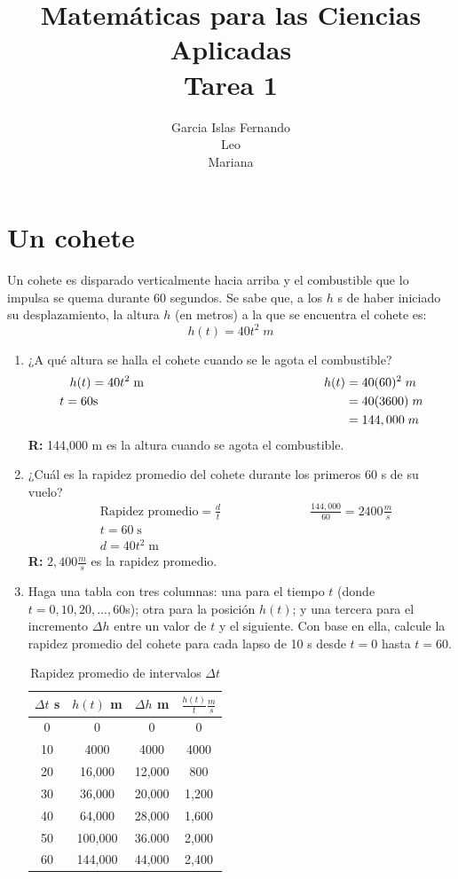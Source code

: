\documentclass[12pt]{article}
\title{Matemáticas para las Ciencias Aplicadas \\ Tarea 1}
\date{}
\author{Garcia Islas Fernando \\ Leo\\Mariana}
\begin{document}
\maketitle
\section{\large Un cohete}
Un cohete es disparado verticalmente hacia arriba y el combustible que lo impulsa se quema durante 60 segundos. Se sabe que, a los $h$ s de haber iniciado su desplazamiento, la altura $h$ (en metros) a la que se encuentra el cohete es: \[h(t) = 40 t^2 \; m\]
\begin{enumerate}
\item ¿A qué altura se halla el cohete cuando se le agota el combustible?
  \begin{align*}
    h(t)= 40t^2 \; \text{m} \hspace{5.1cm}    h(t)&=40(60)^2 \; m\\
t=60\text{s} \hspace{7cm}    &=40(3600) \; m\\
    &=144,000 \; m\\
  \end{align*}
  {\bf R:} 144,000 m es la altura cuando se agota el combustible.
\item ¿Cuál es la rapidez promedio del cohete durante los primeros 60 s de su vuelo?
  \begin{align*}
    &\text{Rapidez promedio}=\frac{d}{t} \hspace{3cm}\frac{144,000}{60}= 2400 \frac{m}{s}\\
    &t = 60\; \text{s} \\
    &d = 40t^2 \; \text{m} 
  \end{align*}
  {\bf R:} $2,400 \frac{m}{s}$ es la rapidez promedio.
\item Haga una tabla con tres columnas: una para el tiempo $t$ (donde $t = 0, 10, 20, . . . , 60 $s); otra para la posición $h(t)$; y una tercera para el incremento $\Delta h$ entre un valor de $t$ y el siguiente. Con base en ella, calcule la rapidez promedio del cohete para cada lapso de 10 s desde $t = 0$ hasta $t = 60$.
  \begin{table}[h]
\begin{center}
\begin{tabular}{| c | c | c |c|}\hline %
  $\Delta t$ s & $h(t)$ m & $\Delta h$ m&$\frac{h(t)}{t}\frac{m}{s}$\\ \hline
0 & 0 & 0 &0 \\ 
10& 4000& 4000& 4000 \\
20&16,000&12,000&800\\
30&36,000&20,000&1,200\\
40&64,000&28,000&1,600\\
50&100,000&36.000&2,000\\
60& 144,000& 44,000& 2,400 \\ \hline
\end{tabular}
\caption{Rapidez promedio de intervalos $\Delta t$} 
\label{tab:rapprom}
\end{center}
\end{table}


\end{enumerate}
\end{document}
